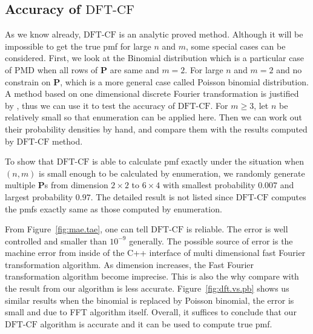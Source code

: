 \documentclass[12pt]{article}
\newcommand{\Pmat}{\mathbf{P}}
\newcommand{\PMD}{\textrm{PMD}}
\newcommand{\dft}{{\textrm{DFT-CF}}}
\begin{document}
\subsection{Accuracy of $\dft$}
As we know already, $\dft$ is an analytic proved method. Although it will be impossible to get the true pmf for large $n$ and $m$, some special cases can be considered. First, we look at the Binomial distribution which is a particular case of $\PMD$ when all rows of $\Pmat$ are same and $m=2$. For large $n$ and $m=2$ and no constrain on $\Pmat$, which is a more general case called Poisson binomial distribution. A method based on one dimensional discrete Fourier transformation is justified by , thus we can use it to test the accuracy of $\dft$. For $m \geq 3$, let $n$ be relatively small so that enumeration can be applied here. Then we can work out their probability densities by hand, and compare them with the results computed by $\dft$ method.

To show that $\dft$ is able to calculate pmf exactly under the situation when $(n,m)$ is small enough to be calculated by enumeration, we randomly generate multiple $\Pmat$s from dimension $2 \times 2$ to $6 \times 4$ with smallest probability $0.007$ and largest probability $0.97$. The detailed result is not listed since $\dft$ computes the pmfs exactly same as those computed by enumeration.

From Figure~\ref{fig:mae.tae}, one can tell $\dft$ is reliable. The error is well controlled and smaller than $10^{-9}$ generally. The possible source of error is the machine error from inside of the C++ interface of multi dimensional fast Fourier transformation algorithm. As dimension increases, the Fast Fourier transformation algorithm become imprecise. This is also the why compare with the result from  our algorithm is less accurate. Figure~\ref{fig:dft.vs.pb} shows us similar results when the binomial is replaced by Poisson binomial, the error is small and due to FFT algorithm itself. Overall, it suffices to conclude that our $\dft$ algorithm is accurate and it can be used to compute true pmf.
\end{document}
